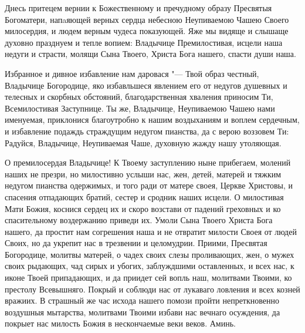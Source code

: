 \begin{mymulticols}


Днесь притецем вернии к Божественному и пречудному образу Пресвятыя Богоматери, напaяющей верных сердца небесною Неупиваемою Чашею Своего милосердия, и людем верным чудеса показующей. Яже мы видяще и слышаще духовно празднуем и тепле вопием: Владычице Премилостивая, исцели наша недуги и страсти, молящи Сына Твоего, Христа Бога нашего, спасти души наша.


Избранное и дивное избавление нам даровася "--- Твой образ честный, Владычице Богородице, яко избавльшеся явлением его от недугов душевных и телесных и скорбных обстояний, благодарственная хваления приносим Ти, Всемилостивая Заступнице. Ты же, Владычице, Неупиваемою Чашею нами именуемая, приклонися благоутробно к нашим воздыханиям и воплем сердечным, и избавление подаждь страждущим недугом пианства, да с верою воззовем Ти: Радуйся, Владычице, Неупиваемая Чаше, духовную жажду нашу утоляющая.


О премилосердая Владычице! К Твоему заступлению ныне прибегаем, молений наших не презри, но милостивно услыши нас, жен, детей, матерей и тяжким недугом пианства одержимых, и того ради от матере своея, Церкве Христовы, и спасения отпадающих братий, сестер и сродник наших исцели. О милостивая Мати Божия, коснися сердец их и скоро возстави от падений греховных и ко спасительному воздержанию приведи их. Умоли Сына Твоего Христа Бога нашего, да простит нам согрешения наша и не отвратит милости Своея от людей Своих, но да укрепит нас в трезвении и целомудрии. Приими, Пресвятая Богородице, молитвы матерей, о чадех своих слезы проливающих, жен, о мужех своих рыдающих, чад сирых и убогих, заблуждшими оставленных, и всех нас, к иконе Твоей припадающих, и да приидет сей вопль наш, молитвами Твоими, ко престолу Всевышняго. Покрый и соблюди нас от лукаваго ловления и всех козней вражиих. В страшный же час исхода нашего помози пройти непреткновенно воздушныя мытарства, молитвами Твоими избави нас вечнаго осуждения, да покрыет нас милость Божия в нескончаемые веки веков. Аминь.

\end{mymulticols}

\mychapterending

